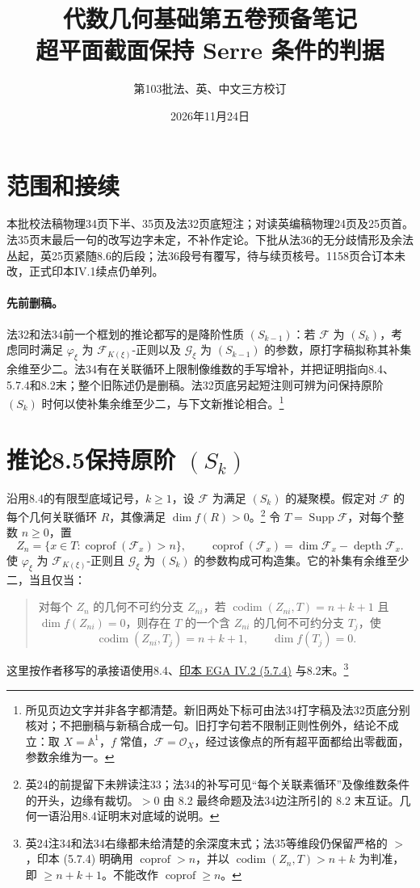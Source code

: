 \documentclass[openany,fontset=fandol]{ctexbook}
\DeclareMathOperator{\codim}{codim}
\DeclareMathOperator{\depth}{depth}
\DeclareMathOperator{\coprof}{coprof}
\DeclareMathOperator{\Supp}{Supp}
\newcommand{\F}{\mathcal F}
\newcommand{\G}{\mathcal G}
\begin{document}
\title{代数几何基础第五卷预备笔记\\超平面截面保持 Serre 条件的判据}
\author{第103批\quad 法、英、中文三方校订}
\date{2026年11月24日}
\maketitle

\section*{范围和接续}
本批校法稿物理34页下半、35页及法32页底短注；对读英编稿物理24页及25页首。法35页末最后一句的改写边字未定，不补作定论。下批从法36的无分歧情形及余法丛起，英25页紧随8.6的后段；法36段号有覆写，待与续页核号。1158页合订本未改，正式印本IV.1续点仍单列。

\paragraph{先前删稿。}
法32和法34前一个框划的推论都写的是降阶性质 $(S_{k-1})$：若 $\F$ 为 $(S_k)$，考虑同时满足 $\varphi_\xi$ 为 $\F_{K(\xi)}$-正则以及 $\G_\xi$ 为 $(S_{k-1})$ 的参数，原打字稿拟称其补集余维至少二。法34有在关联循环上限制像维数的手写增补，并把证明指向8.4、5.7.4和8.2末；整个旧陈述仍是删稿。法32页底另起短注则可辨为问保持原阶 $(S_k)$ 时何以使补集余维至少二，与下文新推论相合。\footnote{所见页边文字并非各字都清楚。新旧两处下标可由法34打字稿及法32页底分别核对；不把删稿与新稿合成一句。旧打字句若不限制正则性例外，结论不成立：取 $X=\mathbb A^1$，$f$ 常值，$\F=\mathcal O_X$，经过该像点的所有超平面都给出零截面，参数余维为一。}

\section*{推论8.5\quad 保持原阶 $(S_k)$}
沿用8.4的有限型底域记号，$k\ge1$，设 $\F$ 为满足 $(S_k)$ 的凝聚模。假定对 $\F$ 的每个几何关联循环 $R$，其像满足 $\dim f(R)>0$。\footnote{英24的前提留下未辨读注33；法34的补写可见“每个关联素循环”及像维数条件的开头，边缘有裁切。$>0$ 由 8.2 最终命题及法34边注所引的 8.2 末互证。几何一语沿用8.4证明末对底域的说明。}
令 $T=\Supp\F$，对每个整数 $n\ge0$，置
\[
 Z_n=\{x\in T:\coprof(\F_x)>n\},\qquad
 \coprof(\F_x)=\dim\F_x-\depth\F_x .
\]
使 $\varphi_\xi$ 为 $\F_{K(\xi)}$-正则且 $\G_\xi$ 为 $(S_k)$ 的参数构成可构造集。它的补集有余维至少二，当且仅当：
\begin{quote}
对每个 $Z_n$ 的几何不可约分支 $Z_{ni}$，若 $\codim(Z_{ni},T)=n+k+1$ 且 $\dim f(Z_{ni})=0$，则存在 $T$ 的一个含 $Z_{ni}$ 的几何不可约分支 $T_j$，使
\[
 \codim(Z_{ni},T_j)=n+k+1,\qquad \dim f(T_j)=0.
\]
\end{quote}
这里按作者移写的承接语使用8.4、\href{https://webusers.imj-prg.fr/~leila.schneps/grothendieckcircle/EGA/EGAIV.2.pdf}{印本 EGA IV.2 (5.7.4)} 与8.2末。\footnote{英24注34和法34右缘都未给清楚的余深度末式；法35等维段仍保留严格的 $>$，印本 (5.7.4) 明确用 $\coprof>n$，并以 $\codim(Z_n,T)>n+k$ 为判准，即 $\ge n+k+1$。不能改作 $\coprof\ge n$。}
\end{document}
